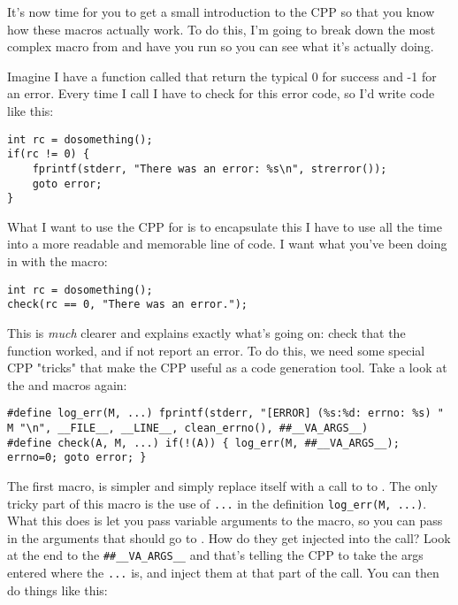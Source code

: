 It's now time for you to get a small introduction to the CPP so that you
know how these macros actually work.  To do this, I'm going to break down
the most complex macro from  and have you run  so
you can see what it's actually doing.

Imagine I have a function called  that return the typical
0 for success and -1 for an error.  Every time I call  I have
to check for this error code, so I'd write code like this:

\begin{Verbatim}
int rc = dosomething();
if(rc != 0) {
    fprintf(stderr, "There was an error: %s\n", strerror());
    goto error;
}
\end{Verbatim}

What I want to use the CPP for is to encapsulate this  I have
to use all the time into a more readable and memorable line of code.  I want
what you've been doing in  with the  macro:

\begin{Verbatim}
int rc = dosomething();
check(rc == 0, "There was an error.");
\end{Verbatim}

This is \emph{much} clearer and explains exactly what's going on: check that the 
function worked, and if not report an error.  To do this, we need some special
CPP "tricks" that make the CPP useful as a code generation tool.  Take a look
at the  and  macros again:

\begin{Verbatim}
#define log_err(M, ...) fprintf(stderr, "[ERROR] (%s:%d: errno: %s) " M "\n", __FILE__, __LINE__, clean_errno(), ##__VA_ARGS__)
#define check(A, M, ...) if(!(A)) { log_err(M, ##__VA_ARGS__); errno=0; goto error; }
\end{Verbatim}

The first macro,  is simpler and simply replace itself with a
call to  to .  The only tricky part of this macro
is the use of \verb|...| in the definition \verb|log_err(M, ...)|.  What this
does is let you pass variable arguments to the macro, so you can pass in the
arguments that should go to .  How do they get injected into the
 call?  Look at the end to the \verb|##__VA_ARGS__| and
that's telling the CPP to take the args entered where the \verb|...| is, and
inject them at that part of the  call.  You can then do things
like this:

